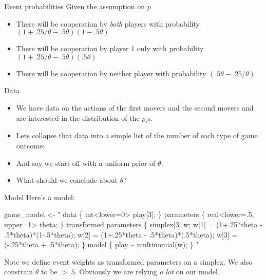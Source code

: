 \documentclass[
  11pt,
  ignorenonframetext,
]{beamer}
\newenvironment{Shaded}{\begin{snugshade}}{\end{snugshade}}
\newcommand{\NormalTok}[1]{\textcolor[rgb]{0.00,0.23,0.31}{#1}}
\newcommand{\OtherTok}[1]{\textcolor[rgb]{0.00,0.23,0.31}{#1}}
\newcommand{\StringTok}[1]{\textcolor[rgb]{0.13,0.47,0.30}{#1}}
\providecommand{\tightlist}{%
  \setlength{\itemsep}{0pt}\setlength{\parskip}{0pt}}\usepackage{longtable,booktabs,array}
\begin{document}
\begin{frame}{Event probabilities}
\protect\hypertarget{event-probabilities-1}{}
Given the assumption on \(p\)

\begin{itemize}
\tightlist
\item
  There will be cooperation by \emph{both} players with probability
  \((1+.25/\theta -.5\theta)(1-.5\theta)\)
\item
  There will be cooperation by player 1 only with probability
  \((1+.25/\theta -.5\theta)(.5\theta)\)
\item
  There will be cooperation by neither player with probability
  \((.5\theta-.25/\theta)\)
\end{itemize}
\end{frame}

\begin{frame}{Data}
\protect\hypertarget{data}{}
\begin{itemize}
\item
  We have data on the actions of the first movers and the second movers
  and are interested in the distribution of the \(p_i\)s.
\item
  Lets collapse that data into a simple list of the number of each type
  of game outcome:
\item
  And say we start off with a uniform prior of \(\theta\).
\item
  What should we conclude about \(\theta\)?
\end{itemize}
\end{frame}

\begin{frame}[fragile]{Model}
\protect\hypertarget{model-1}{}
Here's a model:

\tiny

\begin{Shaded}
\begin{Highlighting}[]
\NormalTok{game\_model }\OtherTok{\textless{}{-}} \StringTok{"}
\StringTok{data \{}
\StringTok{  int\textless{}lower=0\textgreater{} play[3];}
\StringTok{\}}
\StringTok{parameters \{}
\StringTok{  real\textless{}lower=.5, upper=1\textgreater{} theta;}
\StringTok{\}}
\StringTok{transformed parameters \{}
\StringTok{simplex[3] w;}
\StringTok{ w[1] = (1+.25*theta {-} .5*theta)*(1{-}.5*theta);}
\StringTok{ w[2] = (1+.25*theta {-} .5*theta)*(.5*theta);}
\StringTok{ w[3] = ({-}.25*theta  + .5*theta);}
\StringTok{\}}
\StringTok{model \{}
\StringTok{  play \textasciitilde{} multinomial(w);}
\StringTok{\}}
\StringTok{"}
\end{Highlighting}
\end{Shaded}

Note we define event weights as transformed parameters on a simplex. We
also constrain \(\theta\) to be \(>.5\). Obviously we are relying
\emph{a lot} on our model.
\end{frame}
\end{document}
